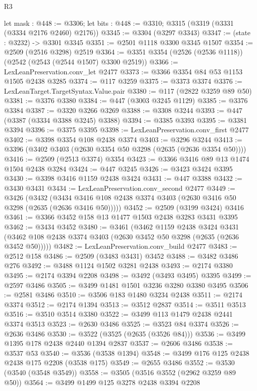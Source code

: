 \begin{lexlean}{R3}
\begin{coremodule}
  let mask : @448 := @3306;
  let bits : @448 := @3310; @3315 (@3319 (@3331 (@3334 @2176 @2460) @2176))
@3345 := @3304 (@3297 @3343)
@3347 := (state : @3232) -> @3301 @3345
@3351 := @2501 @1118 @3300 @3345 @1507
@3354 := @2509 (@2516 @3298) @2519
@3364 := @3351 @3354 (@2526 (@2536 @1118)) (@2542 (@2543 (@2544 @1507) @3300 @2519))
@3366 := LexLeanPreservation.conv_let @2477
@3373 := @3366 @3354 @84 @53 @1153 @1505 @2438 @3285
@3374 := @117 @3259
@3375 := @3373 @3374
@3376 := LexLeanTarget.TargetSyntax.Value.pair
@3380 := @117 (@2822 @3259 @89 @50)
@3381 := @3376 @3380
@3384 := @447 (@3003 @3245 @1129)
@3385 := @3376 @3384
@3387 := @3320 @3266 @3269
@3388 := @3308 @3244
@3393 := @447 (@3387 (@3334 @3388 @3245) @3388)
@3394 := @3385 @3393
@3395 := @3381 @3394
@3396 := @3375 @3395
@3398 := LexLeanPreservation.conv_first @2477
@3402 := @3398 @3354 @108 @2438 @3374
@3403 := @3296 @3244
@3413 := @3396 (@3402 @3403 (@2630 @3354 @50 @3298 (@2635 (@2636 @3354 @50))))
@3416 := @2509 (@2513 @3374) @3354
@3423 := @3366 @3416 @89 @13 @1474 @1504 @2438 @3284
@3424 := @447 @3245
@3426 := @3423 @3424 @3395
@3430 := @3398 @3416 @1159 @2438 @3424
@3431 := @447 @3388
@3432 := @3430 @3431
@3434 := LexLeanPreservation.conv_second @2477
@3449 := @3426
    (@3432 (@3434 @3416 @108 @2438 @3374 @3403 (@2630 @3416 @50 @3298 (@2635 (@2636 @3416 @50)))))
@3452 := @2509 (@3199 @3424) @3416
@3461 := @3366 @3452 @158 @13 @1477 @1503 @2438 @3283 @3431 @3395
@3462 := @3434 @3452
@3480 := @3461
    (@3462
      @1159
      @2438
      @3424
      @3431
      (@3462 @108 @2438 @3374 @3403 (@2630 @3452 @50 @3298 (@2635 (@2636 @3452 @50)))))
@3482 := LexLeanPreservation.conv_build @2477
@3483 := @2512 @158
@3486 := @2509 (@3483 @3431) @3452
@3488 := @3482 @3486 @276
@3492 := @3488 @1124 @1502 @3281 @2438
@3493 := @2174 @3380
@3495 := @2174 @3394 @2208
@3498 := @3492 (@3493 @3495) @3395
@3499 := @2597 @3486
@3505 := @3499 @1481 @1501 @3236 @3280 @3380 @3495
@3506 := @2581 @3486
@3510 := @3506 @183 @1480 @3234 @2438
@3511 := @2174 @3374
@3512 := @2174 @1394
@3513 := @3512 @2837
@3514 := @3511 @3513
@3516 := @3510 @3514 @3380
@3522 := @3499 @113 @1479 @2438 @2441 @3374 @3513
@3523 := @2630 @3486
@3525 := @3523 @84 @3374
@3526 := @2636 @3486
@3530 := @3522 (@3525 (@2635 (@3526 @84)))
@3536 := @3499 @1395 @178 @2438 @2440 @1394 @2837
@3537 := @2606 @3486
@3538 := @3537 @53
@3540 := @3536 (@3538 @1394)
@3548 := @3499 @176 @125 @2438 @2438 @175 @2208 (@3538 @175)
@3549 := @2655 @3486
@3552 := @3530 (@3540 (@3548 @3549))
@3558 := @3505 (@3516 @3552 (@2962 @3259 @89 @50))
@3564 := @3499 @1499 @125 @3278 @2438 @3394 @2208

\end{coremodule}
\end{lexlean}
